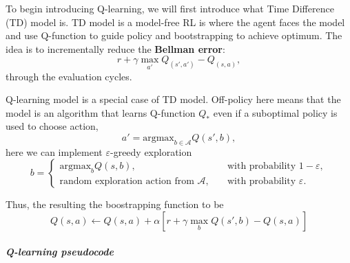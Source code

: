 \documentclass[11pt]{article}
\begin{document}
To begin introducing Q-learning, we will first introduce what Time
Difference (TD) model is. TD model is a model-free RL is where the agent
faces the model and use Q-function to guide policy and bootstrapping to
achieve optimum. The idea is to incrementally reduce the
{\textbf{Bellman error}}: \[
r + \gamma \max_{a'} Q_(s',a') - Q_(s,a),
\] through the evaluation cycles.

Q-learning model is a special case of TD model. Off-policy here means
that the model is an algorithm that learns Q-function \(Q_*\) even if a
suboptimal policy is used to choose action, \[
a' = \text{argmax}_{b\in\mathcal{A}} Q(s',b),
\] here we can implement \(\varepsilon\)-greedy exploration \[
b =
\begin{cases}
\text{argmax}_b Q(s,b),& \quad \text{with probability }1-\varepsilon,
\\
\text{random exploration action from }\mathcal{A},&  \quad \text{with probability }\varepsilon.
\end{cases}
\]

Thus, the resulting the boostrapping function to be \[
Q(s,a) \leftarrow Q(s,a) + \alpha \left[ r + \gamma \max_{b} Q(s',b) - Q(s,a)\right]
\]

\subparagraph{\texorpdfstring{\textbf{Q-learning
pseudocode}}{Q-learning pseudocode}}\label{q-learning-pseudocode}
\end{document}
